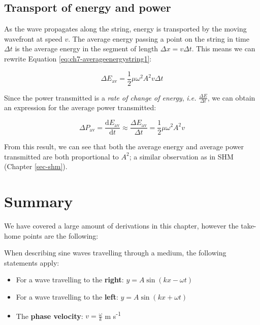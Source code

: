 \documentclass[
]{book}
\providecommand{\tightlist}{%
  \setlength{\itemsep}{0pt}\setlength{\parskip}{0pt}}
\begin{document}
\hypertarget{sec-ch7-transportenergypower}{%
\subsection{Transport of energy and power}\label{sec-ch7-transportenergypower}}

As the wave propagates along the string, energy is transported by the moving wavefront at speed \(v\). The average energy passing a point on the string in time \(\Delta t\) is the average energy in the segment of length \(\Delta x = v\Delta t\). This means we can rewrite Equation \eqref{eq:ch7-averageenergystring1}:

\begin{equation}
\Delta E_{\mathrm{av}} = \frac{1}{2}\mu \omega^2 A^2 v \Delta t
\label{eq:ch7-averageenergystring2}
\end{equation}

Since the power transmitted is a \emph{rate of change of energy}, \emph{i.e.} \(\frac{\Delta E}{\Delta t}\), we can obtain an expression for the average power transmitted:

\begin{equation}
\Delta P_{\mathrm{av}} = \frac{\mathrm{d} E_{\mathrm{av}}}{\mathrm{d}t} \approx \frac{\Delta E_{\mathrm{av}}}{\Delta t} = \frac{1}{2}\mu \omega^2 A^2 v
\label{eq:ch7-averagepowerstring1}
\end{equation}

From this result, we can see that both the average energy and average power transmitted are both proportional to \(A^2\); a similar observation as in SHM (Chapter \ref{sec-shm}).

\hypertarget{sec-ch7-summary}{%
\section{Summary}\label{sec-ch7-summary}}

We have covered a large amount of derivations in this chapter, however the take-home points are the following:

When describing sine waves travelling through a medium, the following statements apply:

\begin{itemize}
\tightlist
\item
  For a wave travelling to the \textbf{right}: \(y = A\sin(kx-\omega t)\)
\item
  For a wave travelling to the \textbf{left}: \(y = A\sin(kx+\omega t)\)
\item
  The \textbf{phase velocity}: \(v = \frac{\omega}{k}\) m s\textsuperscript{-1}
\end{itemize}
\end{document}
